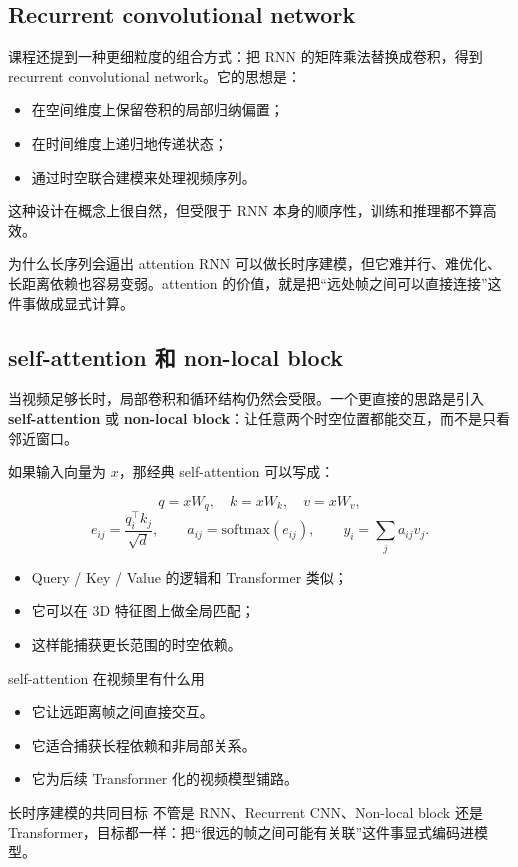 \subsection{Recurrent convolutional network}

课程还提到一种更细粒度的组合方式：把 RNN 的矩阵乘法替换成卷积，得到 recurrent convolutional network。它的思想是：

\begin{itemize}
    \item 在空间维度上保留卷积的局部归纳偏置；
    \item 在时间维度上递归地传递状态；
    \item 通过时空联合建模来处理视频序列。
\end{itemize}

这种设计在概念上很自然，但受限于 RNN 本身的顺序性，训练和推理都不算高效。

\begin{importantbox}{为什么长序列会逼出 attention}
RNN 可以做长时序建模，但它难并行、难优化、长距离依赖也容易变弱。attention 的价值，就是把“远处帧之间可以直接连接”这件事做成显式计算。
\end{importantbox}

\subsection{self-attention 和 non-local block}

当视频足够长时，局部卷积和循环结构仍然会受限。一个更直接的思路是引入 \textbf{self-attention} 或 \textbf{non-local block}：让任意两个时空位置都能交互，而不是只看邻近窗口。

如果输入向量为 $x$，那经典 self-attention 可以写成：

\[
q = xW_q,\quad k = xW_k,\quad v = xW_v,
\]
\[
e_{ij} = \frac{q_i^\top k_j}{\sqrt{d}}, \qquad a_{ij} = \mathrm{softmax}(e_{ij}), \qquad y_i = \sum_j a_{ij} v_j.
\]

\begin{itemize}
    \item Query / Key / Value 的逻辑和 Transformer 类似；
    \item 它可以在 3D 特征图上做全局匹配；
    \item 这样能捕获更长范围的时空依赖。
\end{itemize}

\begin{knowledgebox}{self-attention 在视频里有什么用}
\begin{itemize}
    \item 它让远距离帧之间直接交互。
    \item 它适合捕获长程依赖和非局部关系。
    \item 它为后续 Transformer 化的视频模型铺路。
\end{itemize}
\end{knowledgebox}

\begin{importantbox}{长时序建模的共同目标}
不管是 RNN、Recurrent CNN、Non-local block 还是 Transformer，目标都一样：把“很远的帧之间可能有关联”这件事显式编码进模型。
\end{importantbox}

